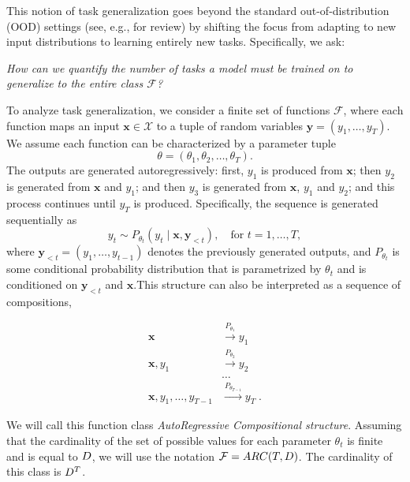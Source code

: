 This notion of task generalization goes beyond the standard out-of-distribution (OOD) settings (see, e.g., \cite{zhou2022domain} for review) by shifting the focus from adapting to new input distributions to learning entirely new tasks. Specifically, we ask:

\medskip
\textit{How can we quantify the number of tasks a model must be trained on to generalize to the entire class $\mathcal{F}$?}
\medskip



To analyze task generalization, we consider a finite set of functions \(\mathcal{F}\), where each function maps an input \(\bm x \in \mathcal{X}\) to a tuple of random variables 
$\bm y = (y_1, \dots, y_T)$. We assume each function can be characterized by a parameter tuple
\[
\theta = (\theta_1, \theta_2, \dots, \theta_T).
\]
The outputs are generated autoregressively: first, \(y_1\) is produced from \(\bm x\); then \(y_2\) is generated from \(\bm x\) and \(y_1\); and then \(y_3\) is generated from \(\bm x\), \(y_1\) and \(y_2\); and this process continues until \(y_T\) is produced. 
 Specifically, the sequence is generated sequentially as
\[
y_t \sim P_{\theta_t}(y_t \mid \bm x, \bm y_{<t}), \quad \text{for } t = 1, \dots, T,
\]
where \(\bm y_{<t} = (y_1, \dots, y_{t-1})\) denotes the previously generated outputs, and $P_{\theta_t}$ is some conditional probability distribution that is parametrized by $\theta_{t}$ and is conditioned on $\bm y_{<t}$ and $\bm x$.This structure can also be interpreted as a sequence of compositions,






\vspace{-2pt}


\begin{align*}
    \bm x &\xrightarrow{P_{\theta_1}} y_1 \\
    \bm x, y_1 &\xrightarrow{P_{\theta_2}} y_2 \\
    &\dots \\
    \bm x, y_1, \dots, y_{T-1} &\xrightarrow{P_{\theta_{T-1}}} y_T\;.
\end{align*}



We will call this function class \textit{AutoRegressive Compositional structure}. 
Assuming that the cardinality of the set of possible values for each parameter $\theta_t$ is finite and is equal to \( D \), we will use the notation $\mathcal{F} =ARC(T, D)$. The cardinality of this class is $D^T$.


